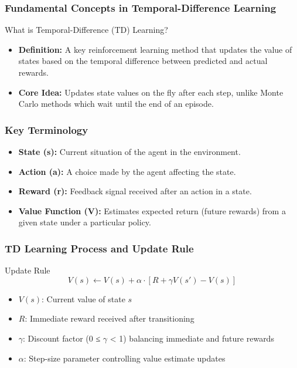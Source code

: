 \documentclass[aspectratio=169]{beamer}
\begin{document}
\begin{frame}[fragile]
    \frametitle{Fundamental Concepts in Temporal-Difference Learning}
    \begin{block}{What is Temporal-Difference (TD) Learning?}
        \begin{itemize}
            \item \textbf{Definition:} A key reinforcement learning method that updates the value of states based on the temporal difference between predicted and actual rewards.
            \item \textbf{Core Idea:} Updates state values on the fly after each step, unlike Monte Carlo methods which wait until the end of an episode.
        \end{itemize}
    \end{block}
\end{frame}

\begin{frame}[fragile]
    \frametitle{Key Terminology}
    \begin{itemize}
        \item \textbf{State (s):} Current situation of the agent in the environment.
        \item \textbf{Action (a):} A choice made by the agent affecting the state.
        \item \textbf{Reward (r):} Feedback signal received after an action in a state.
        \item \textbf{Value Function (V):} Estimates expected return (future rewards) from a given state under a particular policy.
    \end{itemize}
\end{frame}

\begin{frame}[fragile]
    \frametitle{TD Learning Process and Update Rule}
    \begin{block}{Update Rule}
        \begin{equation}
        V(s) \leftarrow V(s) + \alpha \cdot [R + \gamma V(s') - V(s)]
        \end{equation}
        \begin{itemize}
            \item \( V(s) \): Current value of state \( s \)
            \item \( R \): Immediate reward received after transitioning
            \item \( \gamma \): Discount factor (0 ≤ \( \gamma \) < 1) balancing immediate and future rewards
            \item \( \alpha \): Step-size parameter controlling value estimate updates
        \end{itemize}
    \end{block}
\end{frame}
\end{document}
